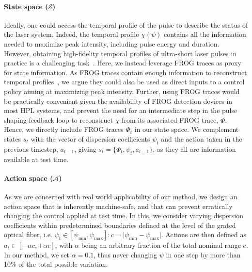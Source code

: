 \paragraph{State space ($\mathcal S$)}
Ideally, one could access the temporal profile of the pulse to describe the status of the laser system. Indeed, the temporal profile $\chi(\psi)$ contains all the information needed to maximize peak intensity, including pulse energy and duration.
However, obtaining high-fidelity temporal profiles of ultra-short laser pulses in practice is a challenging task~\citep{trebino1993using, trebino1997measuring}.
Here, we instead leverage FROG traces as proxy for state information.
As FROG traces contain enough information to reconstruct temporal profiles~\citep{zahavy2018deep}, we argue they could also be used as direct inputs to a control policy aiming at maximizing peak intensity. Further, using FROG traces would be practically convenient given the availability of FROG detection devices in most HPL systems, and prevent the need for an intermediate step in the pulse shaping feedback loop to reconstruct \( \chi \) from its associated FROG trace, \( \Phi \). Hence, we directly include FROG traces $\Phi_t$ in our state space. We complement states $s_t$ with the vector of dispersion coefficients $\psi_t$ and the action taken in the previous timestep, $a_{t-1}$, giving $s_t = \{ \Phi_t, \psi_t, a_{t-1} \}$, as they all are information available at test time.

\paragraph{Action space ($\mathcal A$)}
As we are concerned with real world applicability of our method, we design an action space that is inherently machine-safe, and that can prevent erratically changing the control applied at test time. In this, we consider varying dispersion coefficients within predetermined boundaries defined at the level of the grated optical fiber, i.e. \( \psi_t \in [\psi_{\text{min}}, \psi_\text{max}]: c = \vert\psi_{\text{min}} - \psi_\text{max} \vert \). Actions are then defined as $a_t \in [-\alpha c, +\alpha c]$, with $\alpha$ being an arbitrary fraction of the total nominal range \( c \). In our method, we set $\alpha=0.1$, thus never changing $\psi$ in one step by more than 10\% of the total possible variation.

